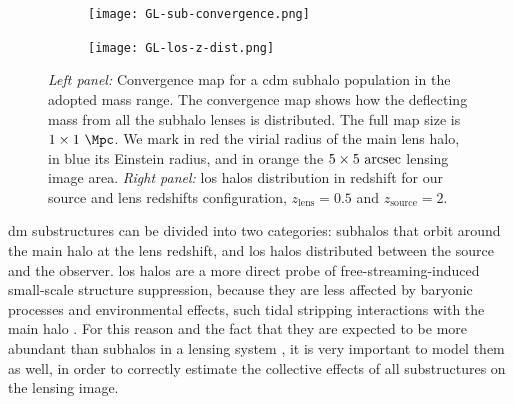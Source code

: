 \begin{figure}
	\centering
	\begin{subfigure}[b]{0.5\linewidth}  
	\centering
	\texttt{[image: GL-sub-convergence.png]}
	\end{subfigure}
	\hfill
	\begin{subfigure}[b]{0.46\linewidth}
	\centering
	\texttt{[image: GL-los-z-dist.png]}
	\end{subfigure} 
	\caption{\textit{Left panel:} Convergence map for a \gls*{cdm} subhalo population in the adopted mass range. The convergence map shows how the deflecting mass from all the subhalo lenses is distributed. The full map size is $1 \times 1\ \si{\Mpc}$. We mark in red the virial radius of the main lens halo, in blue its Einstein radius, and in orange the $5 \times 5\ \si{\arcsec}$ lensing image area. \textit{Right panel: }\gls*{los} halos distribution in redshift for our source and lens redshifts configuration, $z_\mathrm{lens}=0.5$ and $z_\mathrm{source}=2$.}
	\label{fig:sl-substructure}
\end{figure}

\Gls*{dm} substructures can be divided into two categories: subhalos that orbit around the main halo at the lens redshift, and \gls*{los} halos distributed between the source and the observer. \Gls*{los} halos are a more direct probe of free-streaming-induced small-scale structure suppression, because they are less affected by baryonic processes and environmental effects, such tidal stripping interactions with the main halo \citep{Despali:2017ksx}. For this reason and the fact that they are expected to be more abundant than subhalos in a lensing system \citep{Despali:2017ksx, He:2021rjd}, it is very important to model them as well, in order to correctly estimate the collective effects of all substructures on the lensing image. 

